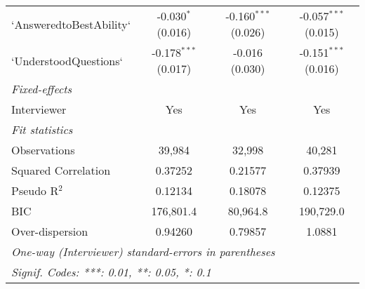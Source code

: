 \begin{tabular}{lccc}
`AnsweredtoBestAbility` & -0.030$^{*}$ (0.016) & -0.160$^{***}$ (0.026) & -0.057$^{***}$ (0.015)\\
`UnderstoodQuestions` & -0.178$^{***}$ (0.017) & -0.016 (0.030) & -0.151$^{***}$ (0.016)\\
\midrule \emph{Fixed-effects}&   &   &  \\
Interviewer & Yes & Yes & Yes\\
\midrule \emph{Fit statistics}&  & & \\
Observations & 39,984&32,998&40,281\\
Squared Correlation & 0.37252&0.21577&0.37939\\
Pseudo R$^2$ & 0.12134&0.18078&0.12375\\
BIC & 176,801.4&80,964.8&190,729.0\\
Over-dispersion & 0.94260&0.79857&1.0881\\
\midrule\midrule\multicolumn{4}{l}{\emph{One-way (Interviewer) standard-errors in parentheses}}\\
\multicolumn{4}{l}{\emph{Signif. Codes: ***: 0.01, **: 0.05, *: 0.1}}\\
\end{tabular}


